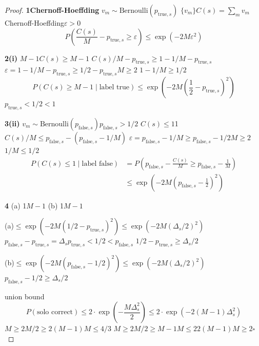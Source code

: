 \documentclass[11pt,a4paper]{article}
\theoremstyle{remark}
\begin{document}
\begin{proof}
\textbf{1Chernoff-Hoeffding}
$v_m \sim \text{Bernoulli}(p_{\text{true},s})$
$\{v_m\}$$C(s) = \sum_m v_m$
Chernoff-Hoeffding\cite{chernoff1952,wainwright2019}$\varepsilon > 0$
\begin{equation}
    P\!\left(\frac{C(s)}{M} - p_{\text{true},s} \geq \varepsilon\right)
    \leq \exp(-2M\varepsilon^2)
\end{equation}

\textbf{2(i)}
$M-1$$C(s) \geq M-1$
$C(s)/M - p_{\text{true},s} \geq 1 - 1/M - p_{\text{true},s}$
$\varepsilon = 1 - 1/M - p_{\text{true},s} \geq 1/2 - p_{\text{true},s}$$M \geq 2$
$1 - 1/M \geq 1/2$
\begin{equation}
    P(C(s) \geq M-1 \mid \text{label true})
    \leq \exp\!\left(-2M\left(\frac{1}{2} - p_{\text{true},s}\right)^2\right)
\end{equation}
$p_{\text{true},s} < 1/2$$<1$

\textbf{3(ii)}
$v_m \sim \text{Bernoulli}(p_{\text{false},s})$$p_{\text{false},s} > 1/2$
$C(s) \leq 1$1
$C(s)/M \leq p_{\text{false},s} - (p_{\text{false},s} - 1/M)$
$\varepsilon = p_{\text{false},s} - 1/M \geq p_{\text{false},s} - 1/2$$M \geq 2$
$1/M \leq 1/2$
\begin{align}
    P(C(s) \leq 1 \mid \text{label false})
    &= P\!\left(p_{\text{false},s} - \frac{C(s)}{M} \geq p_{\text{false},s} - \frac{1}{M}\right) \nonumber\\
    &\leq \exp\!\left(-2M\left(p_{\text{false},s} - \frac{1}{2}\right)^2\right)
\end{align}

\textbf{4}
(a) 1$M-1$
 (b) 1$M-1$

(a)$\leq \exp(-2M(1/2 - p_{\text{true},s})^2) \leq \exp(-2M(\Delta_s/2)^2)$
$p_{\text{false},s} - p_{\text{true},s} = \Delta_s$$p_{\text{true},s} < 1/2 < p_{\text{false},s}$
$1/2 - p_{\text{true},s} \geq \Delta_s/2$

(b)$\leq \exp(-2M(p_{\text{false},s} - 1/2)^2) \leq \exp(-2M(\Delta_s/2)^2)$
$p_{\text{false},s} - 1/2 \geq \Delta_s/2$

union bound
\begin{equation}
    P(\text{solo correct}) \leq 2 \cdot \exp\!\left(-\frac{M\Delta_s^2}{2}\right)
    \leq 2 \cdot \exp\!\left(-2(M-1)\Delta_s^2\right)
\end{equation}
$M \geq 2$$M/2 \geq 2(M-1)$$M \leq 4/3$
$M \geq 2$$M/2 \geq M-1$$M \leq 2$$2(M-1)$$M \geq 2$\hfill $\square$
\end{proof}
\end{document}
